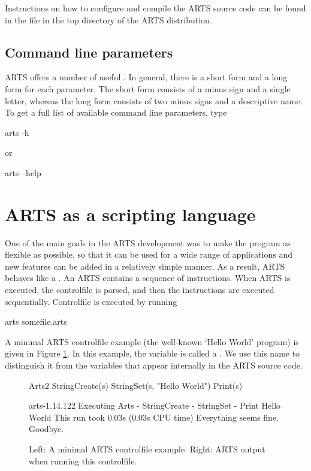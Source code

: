 Instructions on how to configure and compile the ARTS source code can
be found in the file  in the top directory of the
ARTS distribution.

\subsection{Command line parameters}

ARTS offers a number of useful . In
general, there is a short form and a long form for each parameter. The
short form consists of a minus sign and a single letter, whereas the
long form consists of two minus signs and a descriptive name. To get a
full list of available command line parameters, type
\begin{code}
  arts -h
\end{code}
or
\begin{code}
  arts --help
\end{code}

\section{ARTS as a scripting language}

One of the main goals in the ARTS development was to make the program
as flexible as possible, so that it can be used for a wide range of
applications and new features can be added in a relatively simple
manner. As a result, ARTS behaves like a . An ARTS  contains a sequence of
instructions. When ARTS is executed, the controlfile is parsed, and
then the instructions are executed sequentially. Controlfile
 is executed by running
\begin{code}
  arts somefile.arts
\end{code}

A minimal ARTS controlfile example (the well-known `Hello World' program) is
given in Figure \ref{fig:hello}. In this example, the variable  is
called a \emph{}. We use this name to distinguish it from the
variables that appear internally in the ARTS source code.

\begin{figure}
\footnotesize
\begin{minipage}[t]{0.35\hsize}
\begin{code}
Arts2 {
StringCreate(s)
StringSet(s,
   "Hello World")
Print(s)
}
\end{code}
\end{minipage}
\hspace*{\fill}
\begin{minipage}[t]{0.5\hsize}
\begin{code}
arts-1.14.122
Executing Arts
{
- StringCreate
- StringSet
- Print
Hello World
}
This run took 0.03s (0.03s CPU time)
Everything seems fine. Goodbye.
\end{code}
\end{minipage}
\caption{Left: A minimal ARTS controlfile example. Right: ARTS output
  when running this controlfile. } 
\label{fig:hello}
\end{figure}

